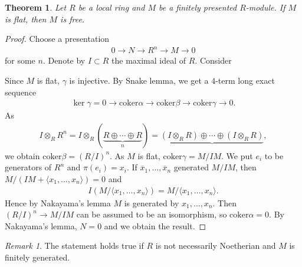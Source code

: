 \documentclass[12pt]{report}
\theoremstyle{plain}
\newtheorem{theorem}{Theorem}[section]
\theoremstyle{remark}
\newtheorem*{remark}{Remark}
\theoremstyle{definition}
\begin{document}
\begin{theorem}
    Let $R$ be a local ring and $M$ be a finitely presented $R$-module. If $M$ is flat, then $M$ is free.
\end{theorem}
\begin{proof}
    Choose a presentation
    \begin{align*}
        0\to N\to R^n\to M\to 0
    \end{align*}
    for some $n$. Denote by $I\subset R$ the maximal ideal of $R$. Consider
    \begin{figure}[H]
        \centering
    \end{figure}
    \noindent Since $M$ is flat, $\gamma$ is injective. By Snake lemma, we get a $4$-term long exact sequence
    \begin{align*}
        \ker\gamma = 0\to \mathrm{coker}\alpha\to\mathrm{coker}\beta\to\mathrm{coker}\gamma\to 0.
    \end{align*}
    As
    \begin{align*}
        I\otimes_R R^n = I\otimes_R (\underbrace{R\oplus \cdots\oplus R}_n) = \underbrace{(I\otimes_R R)\oplus \cdots\oplus (I\otimes_R R)},
    \end{align*}
    we obtain $\mathrm{coker}\beta=(R/I)^n$. As $M$ is flat, $\mathrm{coker}\gamma=M/IM$. We put $e_i$ to be generators of $R^n$ and $\pi(e_i)=x_i$. If $\overline{x}_1,\dots,\overline{x}_n$ generated $M/IM$, then $M/(IM+\langle x_{1},\dots,x_{n}\rangle)=0$ and
    \begin{align*}
        I(M/\langle x_1,\dots,x_n\rangle) = M/\langle x_1,\dots,x_n\rangle.
    \end{align*}
    Hence by Nakayama's lemma $M$ is generated by $x_1,\dots,x_n$. Then $(R/I)^n\to M/IM$ can be assumed to be an isomorphism, so $\mathrm{coker}\alpha=0$. By Nakayama's lemma, $N=0$ and we obtain the result.
\end{proof}
\begin{remark}
    The statement holds true if $R$ is not necessarily Noetherian and $M$ is finitely generated.
\end{remark}
\end{document}

